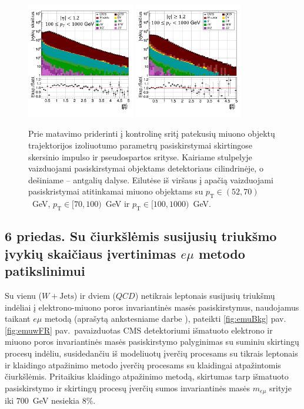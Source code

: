 \documentclass[a4paper, 12pt, oneside]{article}
\newcommand{\pT}{p_{\mathrm{T}}}
\newcommand{\emu}{e\mu}
\newcommand{\WJets}{W\! +\!\mathrm{Jets}}
\newcommand{\QCD}{QC\! D}
\begin{document}
\vspace{-1cm}
\begin{figure}[H]
	\includegraphics[width=0.42\textwidth]{Magistrinis/TFIT_ctrl_barrel_100to1000.png}
	\includegraphics[width=0.42\textwidth]{Magistrinis/TFIT_ctrl_endcap_100to1000.png}
	\vspace{-0.7cm}
	\caption{\label{fig:tFit_control}Prie matavimo priderinti į kontrolinę sritį patekusių miuono objektų trajektorijos izoliuotumo
	parametrų pasiskirstymai skirtingose skersinio impulso ir pseudospartos srityse.
	Kairiame stulpelyje vaizduojami pasiskirstymai objektams detektoriaus cilindrinėje, o dešiniame -- antgalių dalyse.
	Eilutėse iš viršaus į apačią vaizduojami pasiskristymai atitinkamai miuono objektams su $\pT\!\in\!(52,70)$~GeV,
	$\pT\!\in\![70,100)$~GeV ir $\pT\!\in\![100,1000)$~GeV.}
\end{figure}


\subsection*{6 priedas. Su čiurkšlėmis susijusių triukšmo įvykių skaičiaus įvertinimas $\emu$ metodo patikslinimui}
Su vienu ($\WJets$) ir dviem ($\QCD$) netikrais leptonais susijusių triukšmų indėliai į elektrono-miuono
poros invariantinės masės pasiskirstymus, naudojamus taikant $\emu$ metodą (aprašytą ankstesniame darbe \cite{MAbak}),
pateikti \ref{fig:emuBkg} pav.
\ref{fig:emuwFR} pav.\ pavaizduotas CMS detektoriumi išmatuoto elektrono ir miuono poros invariantinės masės pasiskirstymo
palyginimas su suminiu skirtingų procesų indėliu, susidedančiu iš modeliuotų įverčių procesams su tikrais leptonais ir 
klaidingo atpažinimo metodo įverčių procesams su klaidingai atpažintomis čiurkšlėmis.
Pritaikius klaidingo atpažinimo metodą, skirtumas tarp išmatuoto pasiskirstymo ir skirtingų procesų įverčių sumos invariantinės
masės $m_{\emu}$ srityje iki $700$~GeV nesiekia $8\%$.
\end{document}
